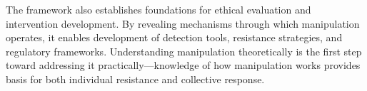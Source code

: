 The framework also establishes foundations for ethical evaluation and intervention development. By revealing mechanisms through which manipulation operates, it enables development of detection tools, resistance strategies, and regulatory frameworks. Understanding manipulation theoretically is the first step toward addressing it practically—knowledge of how manipulation works provides basis for both individual resistance and collective response.